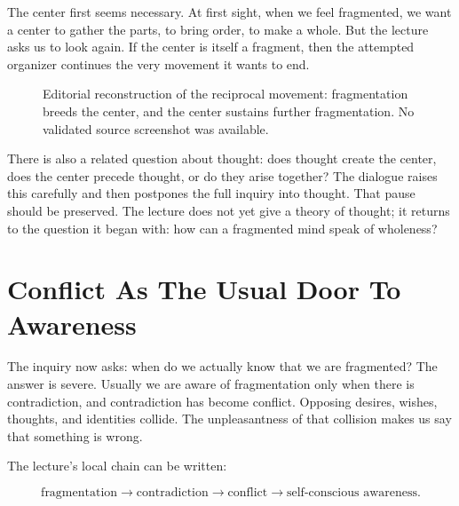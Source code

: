 The center first seems necessary. At first sight, when we feel fragmented, we want a center to gather the parts, to bring order, to make a whole. But the lecture asks us to look again. If the center is itself a fragment, then the attempted organizer continues the very movement it wants to end.

\begin{figure}
\centering
{}
\caption{Editorial reconstruction of the reciprocal movement: fragmentation breeds the center, and the center sustains further fragmentation. No validated source screenshot was available.}
\end{figure}

There is also a related question about thought: does thought create the center, does the center precede thought, or do they arise together? The dialogue raises this carefully and then postpones the full inquiry into thought. That pause should be preserved. The lecture does not yet give a theory of thought; it returns to the question it began with: how can a fragmented mind speak of wholeness?

\section{Conflict As The Usual Door To Awareness}

The inquiry now asks: when do we actually know that we are fragmented? The answer is severe. Usually we are aware of fragmentation only when there is contradiction, and contradiction has become conflict. Opposing desires, wishes, thoughts, and identities collide. The unpleasantness of that collision makes us say that something is wrong.

The lecture's local chain can be written:

\begin{equation}
\text{fragmentation}
\longrightarrow
\text{contradiction}
\longrightarrow
\text{conflict}
\longrightarrow
\text{self-conscious awareness}.
\end{equation}


